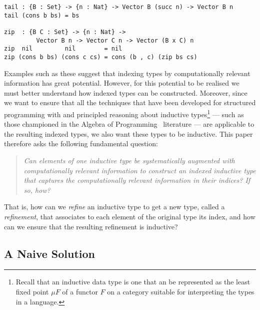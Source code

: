 \documentclass{LMCS}
\begin{document}
\begin{verbatim}
tail : {B : Set} -> {n : Nat} -> Vector B (succ n) -> Vector B n
tail (cons b bs) = bs

zip  : {B C : Set} -> {n : Nat} -> 
         Vector B n -> Vector C n -> Vector (B x C) n
zip  nil         nil        = nil
zip (cons b bs) (cons c cs) = cons (b , c) (zip bs cs)
\end{verbatim}

\noindent
Examples such as these suggest that indexing types by computationally
relevant information has great potential. However, for this potential
to be realised we must better understand how indexed types can be
constructed. Moreover, since we want to ensure that all the techniques
that have been developed for structured programming with and
principled reasoning about inductive types\footnote{Recall that an
  inductive data type is one that an be represented as the least fixed
  point $\mu F$ of a functor $F$ on a category suitable for
  interpreting the types in a language.} --- such as those championed
in the Algebra of Programming~\cite{bdm97} literature --- are
applicable to the resulting indexed types, we also want these types to
be inductive.  This paper therefore asks the following fundamental
question:

\vspace*{0.1in}

\begin{quote}
  \em Can elements of one inductive type be systematically augmented
  with computationally relevant information to construct an indexed
  inductive type that captures the computationally relevant
  information in their indices? If so, how?
\end{quote}

\vspace*{0.1in}

\noindent
That is, how can we {\em refine} an inductive type to get a new type,
called a {\em refinement}, that associates to each element of the
original type its index, and how can we ensure that the resulting
refinement is inductive?

\subsection{A Naive Solution}
\end{document}
